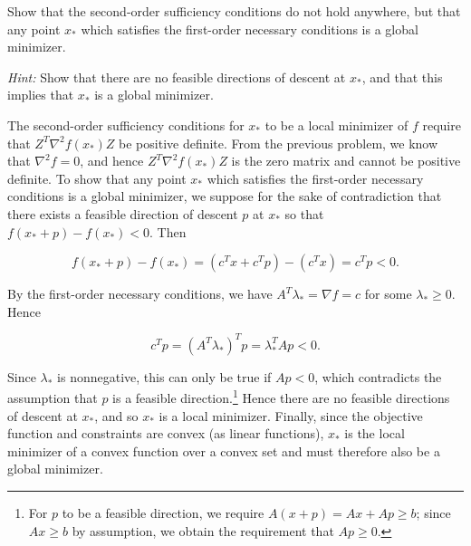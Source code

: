 Show that the second-order sufficiency conditions do not hold anywhere, but that any point $x_*$ which satisfies the
first-order necessary conditions is a global minimizer.

\textit{Hint: } Show that there are no feasible directions of descent at $x_*$, and that this implies that $x_*$ is a
global minimizer.

\begin{solution}
    The second-order sufficiency conditions for $x_*$ to be a local minimizer of $f$ require that 
    $Z^T \nabla^2 f(x_*) Z$ be positive definite. From the previous problem, we know that $\nabla^2 f = 0$, and hence 
    $Z^T \nabla ^2 f(x_*) Z$ is the zero matrix and cannot be positive definite. To show that any point $x_*$ which
    satisfies the first-order necessary conditions is a global minimizer, we suppose for the sake of contradiction that
    there exists a feasible direction of descent $p$ at $x_*$ so that $f(x_* + p) - f(x_*) < 0$. Then

    $$
    f(x_* + p) - f(x_*) = (c^T x + c^T p) - (c^T x) = c^T p < 0.
    $$

    By the first-order necessary conditions, we have $A^T \lambda_* = \nabla f = c$ for some \newline
    $\lambda_* \ge 0$. Hence

    $$
        c^T p = \left(A^T \lambda_*\right)^T p = \lambda_*^T A p < 0.
    $$

    Since $\lambda_*$ is nonnegative, this can only be true if $A p < 0$, which contradicts the assumption that $p$ is a
    feasible direction.\footnote{
        For $p$ to be a feasible direction, we require $A(x + p) = Ax + Ap \ge b$; since $Ax \ge b$ by assumption, we
        obtain the requirement that $Ap \ge 0$.
    } Hence there are no feasible directions of descent at $x_*$, and so $x_*$ is a local minimizer. Finally, since the
    objective function and constraints are convex (as linear functions), $x_*$ is the local minimizer of a convex 
    function over a convex set and must therefore also be a global minimizer.
    \ \\
\end{solution}